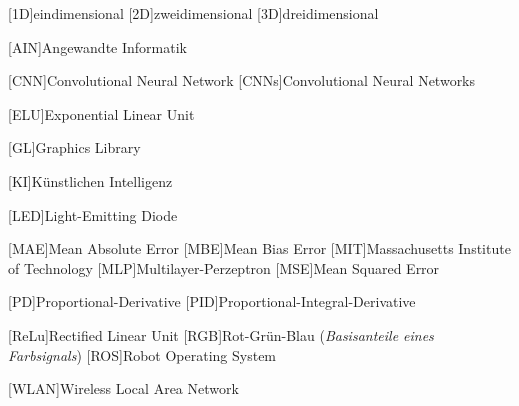 
\begin{acronym}[ROS]
	[1D]{eindimensional}
	[2D]{zweidimensional}
	[3D]{dreidimensional}
	
	[AIN]{Angewandte Informatik}
	
	[CNN]{Convolutional Neural Network}
	[CNNs]{Convolutional Neural Networks}
	
	[ELU]{Exponential Linear Unit}
	
	[GL]{Graphics Library}
	
	[KI]{Künstlichen Intelligenz}
	
	[LED]{Light-Emitting Diode}
	
	[MAE]{Mean Absolute Error}
	[MBE]{Mean Bias Error}
	[MIT]{Massachusetts Institute of Technology}
	[MLP]{Multilayer-Perzeptron}
	[MSE]{Mean Squared Error}
	
	[PD]{Proportional-Derivative}
	[PID]{Proportional-Integral-Derivative}
	
	[ReLu]{Rectified Linear Unit}
	[RGB]{Rot-Grün-Blau (\textit{Basisanteile eines Farbsignals})}
	[ROS]{Robot Operating System}
	
	[WLAN]{Wireless Local Area Network}
\end{acronym}

